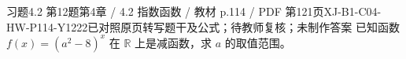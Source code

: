 \par\noindent\begin{minipage}{\linewidth}
\begin{bankitem}{习题4.2 第12题}{第4章 / 4.2 指数函数 / 教材 p.114 / PDF 第121页}{XJ-B1-C04-HW-P114-Y1222}{已对照原页转写题干及公式；待教师复核；未制作答案}
已知函数 $f(x)=(a^2-8)^x$ 在 $\mathbb R$ 上是减函数，求 $a$ 的取值范围。
\end{bankitem}
\end{minipage}\par\medskip
